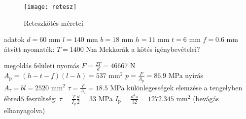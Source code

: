 \begin{wrapfigure}{R}{.48\textwidth}
	\centering
	\vspace{-3cm}
	\centering
	\texttt{[image: retesz]}
	\caption{Reteszkötés méretei}
\end{wrapfigure}
\parbox{.5\textwidth}{
\begin{outline}
	\1 adatok
		\2 $d=60$ mm
		\2 $l=140$ mm
		\2 $b=18$ mm
		\2 $h=11$ mm
		\2 $t=6$ mm
		\2 $f=0.6$ mm
		\2 átvitt nyomaték: $T=1400$ Nm
		\2 Mekkorák a kötés igénybevételei?
\end{outline}}
\begin{outline}
	\1 megoldás
		\2 felületi nyomás
			\3 $F = \frac{2T}{d} = 46667$ N
			\3 $A_\text{p} = (h-t-f)(l-h) = 537\text{ mm}^2$
			\3 $p=\frac{F}{A_\text{p}}=86.9$ MPa
		\2 nyírás
			\3 $A_\tau = bl=2520\text{ mm}^2$
			\3 $\tau=\frac{F}{A_\tau}=18.5$ MPa
		\2 különlegességek elemzése
			\3 a tengelyben ébredő feszültség: $\tau=\frac{T}{I_\text{p}}\frac{d}{2}=33$ MPa
			\3 $I_\text{p}=\frac{d^4\pi}{32}=1272.345\text{ mm}^2$ (bevágás elhanyagolva)
\end{outline}
